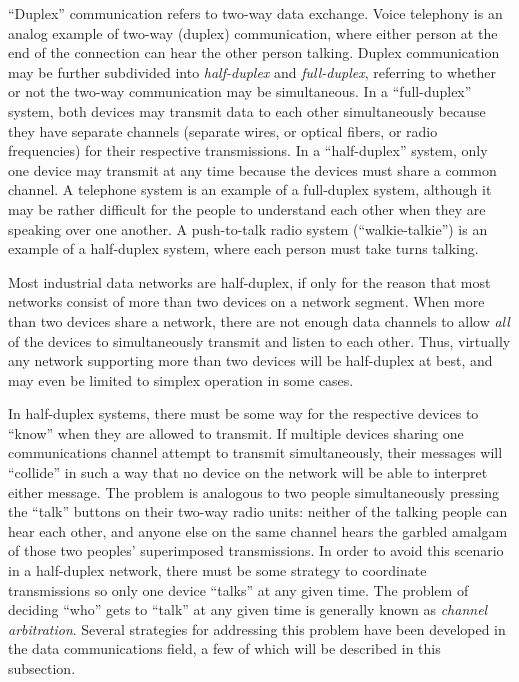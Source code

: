 ``Duplex'' communication refers to two-way data exchange.  Voice telephony is an analog example of two-way (duplex) communication, where either person at the end of the connection can hear the other person talking.  Duplex communication may be further subdivided into \textit{half-duplex} and \textit{full-duplex}, referring to whether or not the two-way communication may be simultaneous.  In a ``full-duplex'' system, both devices may transmit data to each other simultaneously because they have separate channels (separate wires, or optical fibers, or radio frequencies) for their respective transmissions.  In a ``half-duplex'' system, only one device may transmit at any time because the devices must share a common channel.  A telephone system is an example of a full-duplex system, although it may be rather difficult for the people to understand each other when they are speaking over one another.  A push-to-talk radio system (``walkie-talkie'') is an example of a half-duplex system, where each person must take turns talking.    

Most industrial data networks are half-duplex, if only for the reason that most networks consist of more than two devices on a network segment.  When more than two devices share a network, there are not enough data channels to allow \textit{all} of the devices to simultaneously transmit and listen to each other.  Thus, virtually any network supporting more than two devices will be half-duplex at best, and may even be limited to simplex operation in some cases.

\vskip 10pt

In half-duplex systems, there must be some way for the respective devices to ``know'' when they are allowed to transmit.  If multiple devices sharing one communications channel attempt to transmit simultaneously, their messages will ``collide'' in such a way that no device on the network will be able to interpret either message.  The problem is analogous to two people simultaneously pressing the ``talk'' buttons on their two-way radio units: neither of the talking people can hear each other, and anyone else on the same channel hears the garbled amalgam of those two peoples' superimposed transmissions.  In order to avoid this scenario in a half-duplex network, there must be some strategy to coordinate transmissions so only one device ``talks'' at any given time.  The problem of deciding ``who'' gets to ``talk'' at any given time is generally known as \textit{channel arbitration}.  Several strategies for addressing this problem have been developed in the data communications field, a few of which will be described in this subsection.    








